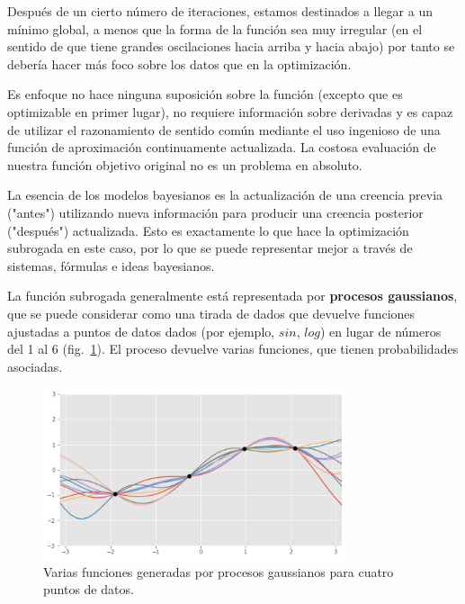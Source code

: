 \documentclass[a4paper,12pt]{article}
\begin{document}
Después de un cierto número de iteraciones, estamos destinados a llegar a un mínimo global, a menos que la forma de la función sea muy irregular (en el sentido de que tiene grandes oscilaciones hacia arriba y hacia abajo) por tanto se debería hacer más foco sobre los datos que en la optimización.

Es enfoque no hace ninguna suposición sobre la función (excepto que es optimizable en primer lugar), no requiere información sobre derivadas y es capaz de utilizar el razonamiento de sentido común mediante el uso ingenioso de una función de aproximación continuamente actualizada. La costosa evaluación de nuestra función objetivo original no es un problema en absoluto.

La esencia de los modelos bayesianos es la actualización de una creencia previa ("antes") utilizando nueva información para producir una creencia posterior ("después") actualizada. Esto es exactamente lo que hace la optimización subrogada en este caso, por lo que se puede representar mejor a través de sistemas, fórmulas e ideas bayesianos.

La función subrogada generalmente está representada por \textbf{procesos gaussianos}, que se puede considerar como una tirada de dados que devuelve funciones ajustadas a puntos de datos dados (por ejemplo, $sin$, $log$) en lugar de números del 1 al 6 (fig.~\ref{fig:bayes4}). El proceso devuelve varias funciones, que tienen probabilidades asociadas.

\begin{figure}[H]
	\begin{center}
	\includegraphics[width=0.8\textwidth]{bayes_opt_4.png}
  	\caption{Varias funciones generadas por procesos gaussianos para cuatro puntos de datos.}
  	\label{fig:bayes4}
  	\end{center}
\end{figure}
\end{document}
